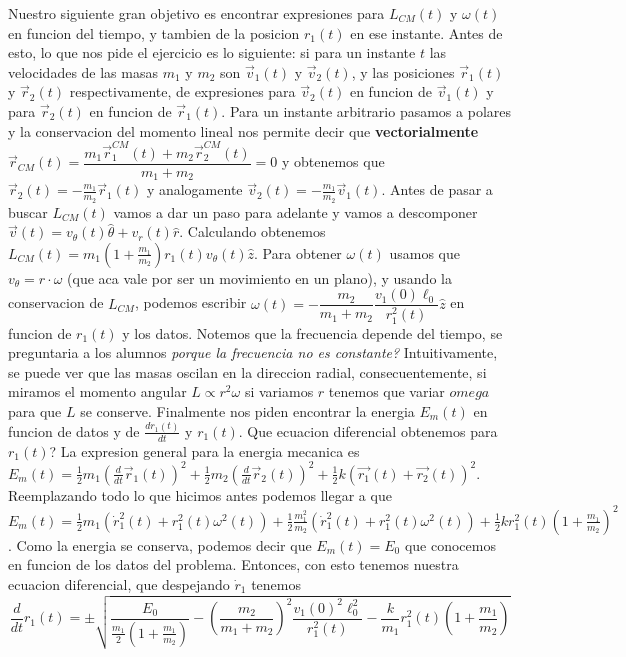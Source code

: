 \documentclass[12pt,a4paper]{article}
\begin{document}
Nuestro siguiente gran objetivo es encontrar expresiones para $L_{CM}(t)$ y $\omega(t)$ en funcion del tiempo, y tambien de la posicion $r_1(t)$ en ese instante. Antes de esto, lo que nos pide el ejercicio es lo siguiente: si para un instante $t$ las velocidades de las masas $m_1$ y $m_2$ son $\vec{v}_1(t)$ y $\vec{v}_2(t)$, y las posiciones $\vec{r}_1(t)$ y $\vec{r}_2(t)$ respectivamente, de expresiones para $\vec{v}_2(t)$ en funcion de $\vec{v}_1(t)$ y para $\vec{r}_2(t)$ en funcion de $\vec{r}_1(t)$. Para un instante arbitrario pasamos a polares y la conservacion del momento lineal nos permite decir que \textbf{vectorialmente}
$\vec{r}_{CM}(t)=\dfrac{m_1\vec{r}_1^{CM}(t)+m_2\vec{r}_2^{CM}(t)}{m_1+m_2}=0$ y obtenemos que $\vec{r}_2(t)=-\frac{m_1}{m_2}\vec{r}_1(t)$ y analogamente $\vec{v}_2(t)=-\frac{m_1}{m_2}\vec{v}_1(t)$. Antes de pasar a buscar $L_{CM}(t)$ vamos a dar un paso para adelante y vamos a descomponer $\vec{v}(t)=v_\theta(t) \hat{\theta}+v_r(t) \hat{r}$. Calculando obtenemos 
$L_{CM}(t)=m_1(1+\frac{m_1}{m_2})r_1(t)v_\theta(t)\hat{z}$. Para obtener $\omega(t)$ usamos que $v_\theta=r\cdot\omega$ (que aca vale por ser un movimiento en un plano), y usando la conservacion de $L_{CM}$, podemos escribir 
$\omega(t)=-\dfrac{m_2}{m_1+m_2}\dfrac{v_1(0)\ell_0}{r_1^2(t)}\hat{z}$ en funcion de $r_1(t)$ y los datos. Notemos que la frecuencia depende del tiempo, se preguntaria a los alumnos \textit{porque la frecuencia no es constante?} Intuitivamente, se puede ver que las masas oscilan en la direccion radial, consecuentemente, si miramos el momento angular $L \propto r^2\omega $ si variamos $r$ tenemos que variar $omega$ para que $L$ se conserve. Finalmente nos piden encontrar la energia $E_m(t)$ en funcion de datos y de $\frac{d r_1(t)}{dt}$ y $r_1(t)$. Que ecuacion diferencial obtenemos para $r_1(t)$? La expresion general para la energia mecanica es 
$E_m(t)=\frac{1}{2}m_1(\frac{d}{dt} \vec{r}_1(t))^2+\frac{1}{2}m_2(\frac{d}{dt} \vec{r}_2(t))^2+\frac{1}{2}k(\vec{r_1}(t)+\vec{r_2}(t))^2$. Reemplazando todo lo que hicimos antes podemos llegar a que 
$E_m(t)=\frac{1}{2}m_1(\dot r_1^2(t)+r_1^2(t)\omega^2(t))+\frac{1}{2}\frac{m_1^2}{m_2}(\dot r_1^2(t)+r_1^2(t)\omega^2(t))+\frac{1}{2}kr_1^2(t)(1+\frac{m_1}{m_2})^2$. Como la energia se conserva, podemos decir que $E_m(t)=E_0$ que conocemos en funcion de los datos del problema. Entonces, con esto tenemos nuestra ecuacion diferencial, que despejando $\dot r_1$ tenemos
\begin{equation}\label{eq:dif}
\frac{d}{dt}r_1(t)=\pm \sqrt{\frac{E_0}{\frac{m_1}{2}(1+\frac{m_1}{m_2})}-\left(\frac{m_2}{m_1+m_2}\right)^2\frac{v_1(0)^2\ell_0^2}{r_1^2(t)}-\frac{k}{m_1}r_1^2(t)\left(1+\frac{m_1}{m_2}\right)}
\end{equation}
\end{document}
